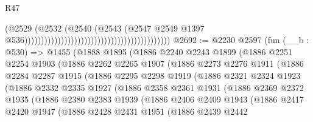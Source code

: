 \begin{lexlean}{R47}
\begin{coremodule}
                                                                                  (@2529
                                                                                    (@2532
                                                                                      (@2540
                                                                                        (@2543
                                                                                          (@2547
                                                                                            @2549
                                                                                            @1397
                                                                                            @536))))))))))))))))))))))))))))))))))))))))))))
@2692 := @2230
    @2597
    (fun (__b : @530) =>
    @1455
      (@1888
        @1895
        (@1886
          @2240
          @2243
          @1899
          (@1886
            @2251
            @2254
            @1903
            (@1886
              @2262
              @2265
              @1907
              (@1886
                @2273
                @2276
                @1911
                (@1886
                  @2284
                  @2287
                  @1915
                  (@1886
                    @2295
                    @2298
                    @1919
                    (@1886
                      @2321
                      @2324
                      @1923
                      (@1886
                        @2332
                        @2335
                        @1927
                        (@1886
                          @2358
                          @2361
                          @1931
                          (@1886
                            @2369
                            @2372
                            @1935
                            (@1886
                              @2380
                              @2383
                              @1939
                              (@1886
                                @2406
                                @2409
                                @1943
                                (@1886
                                  @2417
                                  @2420
                                  @1947
                                  (@1886
                                    @2428
                                    @2431
                                    @1951
                                    (@1886
                                      @2439
                                      @2442

\end{coremodule}
\end{lexlean}
